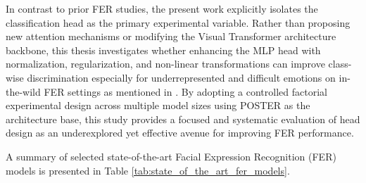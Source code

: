 In contrast to prior \gls{FER} studies, the present work explicitly isolates the classification head as the primary experimental variable. Rather than proposing new attention mechanisms or modifying the Visual Transformer architecture backbone, this thesis investigates whether enhancing the MLP head with normalization, regularization, and non-linear transformations can improve class-wise discrimination especially for underrepresented and difficult emotions on \gls{in-the-wild} \gls{FER} settings as mentioned in \cite{li_reliable_2017, mollahosseini_affectnet_2019, zhang_leave_2023}. By adopting a controlled factorial experimental design across multiple model sizes using \gls{POSTER} as the architecture base, this study provides a focused and systematic evaluation of head design as an underexplored yet effective avenue for improving \gls{FER} performance.

A summary of selected state-of-the-art Facial Expression Recognition (\gls{FER}) models is presented in Table \ref{tab:state_of_the_art_fer_models}.

